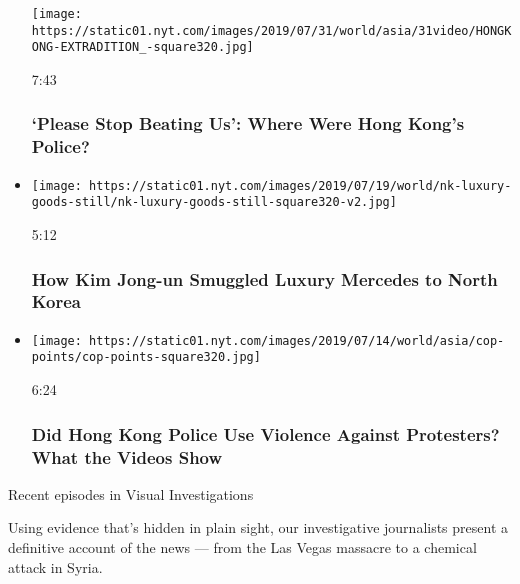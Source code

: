 \begin{itemize}
  \texttt{[image: https://static01.nyt.com/images/2019/07/31/world/asia/31video/HONGKONG-EXTRADITION\_-square320.jpg]}

  7:43

  \hypertarget{please-stop-beating-us-where-were-hong-kongs-police}{%
  \subsubsection{`Please Stop Beating Us': Where Were Hong Kong's
  Police?}\label{please-stop-beating-us-where-were-hong-kongs-police}}
\item
  \href{https://www.nytimes.com/video/world/asia/100000006469635/north-korea-sanctions.html?action=click\&module=video-series-bar\&region=header\&pgtype=Article\&playlistId=video/investigations}{}

  \texttt{[image: https://static01.nyt.com/images/2019/07/19/world/nk-luxury-goods-still/nk-luxury-goods-still-square320-v2.jpg]}

  5:12

  \hypertarget{how-kim-jong-un-smuggled-luxury-mercedes-to-north-korea}{%
  \subsubsection{How Kim Jong-un Smuggled Luxury Mercedes to North
  Korea}\label{how-kim-jong-un-smuggled-luxury-mercedes-to-north-korea}}
\item
  \href{https://www.nytimes.com/video/world/asia/100000006602584/hong-kong-police-protest-video-investigation.html?action=click\&module=video-series-bar\&region=header\&pgtype=Article\&playlistId=video/investigations}{}

  \texttt{[image: https://static01.nyt.com/images/2019/07/14/world/asia/cop-points/cop-points-square320.jpg]}

  6:24

  \hypertarget{did-hong-kong-police-use-violence-against-protesters-what-the-videos-show}{%
  \subsubsection{Did Hong Kong Police Use Violence Against Protesters?
  What the Videos
  Show}\label{did-hong-kong-police-use-violence-against-protesters-what-the-videos-show}}
\end{itemize}

Recent episodes in Visual Investigations

Using evidence that's hidden in plain sight, our investigative
journalists present a definitive account of the news --- from the Las
Vegas massacre to a chemical attack in Syria.

